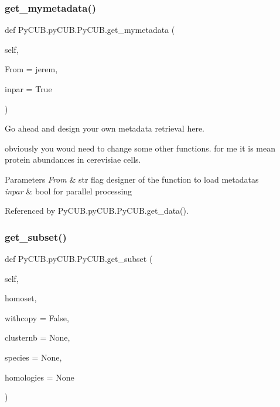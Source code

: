 \subsubsection{\texorpdfstring{get\+\_\+mymetadata()}{get\_mymetadata()}}
{\footnotesize\ttfamily def Py\+C\+U\+B.\+py\+C\+U\+B.\+Py\+C\+U\+B.\+get\+\_\+mymetadata (\begin{DoxyParamCaption}\item[{}]{self,  }\item[{}]{From = {\ttfamily \textquotesingle{}jerem\textquotesingle{}},  }\item[{}]{inpar = {\ttfamily True} }\end{DoxyParamCaption})}



Go ahead and design your own metadata retrieval here. 

obviously you woud need to change some other functions. for me it is mean protein abundances in cerevisiae cells.


\begin{DoxyParams}{Parameters}
{\em From} & str flag designer of the function to load metadatas \\
\hline
{\em inpar} & bool for parallel processing \\
\hline
\end{DoxyParams}


Referenced by Py\+C\+U\+B.\+py\+C\+U\+B.\+Py\+C\+U\+B.\+get\+\_\+data().

\mbox{\label{class_py_c_u_b_1_1py_c_u_b_1_1_py_c_u_b_a9fab964d44e03b46d330b3754f5c39fb}} 
\subsubsection{\texorpdfstring{get\+\_\+subset()}{get\_subset()}}
{\footnotesize\ttfamily def Py\+C\+U\+B.\+py\+C\+U\+B.\+Py\+C\+U\+B.\+get\+\_\+subset (\begin{DoxyParamCaption}\item[{}]{self,  }\item[{}]{homoset,  }\item[{}]{withcopy = {\ttfamily False},  }\item[{}]{clusternb = {\ttfamily None},  }\item[{}]{species = {\ttfamily None},  }\item[{}]{homologies = {\ttfamily None} }\end{DoxyParamCaption})}



